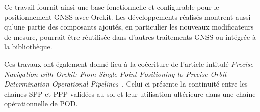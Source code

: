 Ce travail fournit ainsi une base fonctionnelle et configurable pour le
positionnement GNSS avec Orekit. Les développements réalisés montrent aussi
qu'une partie des composants ajoutés, en particulier les nouveaux modificateurs
de mesure, pourrait être réutilisée dans d'autres traitements GNSS ou intégrée à
la bibliothèque.

Ces travaux ont également donné lieu à la coécriture de l'article intitulé \textit{Precise Navigation with Orekit: From
Single Point Positioning to Precise Orbit Determination Operational
Pipelines}~\cite{zemouliScardino2026preciseNavigation}. Celui-ci présente la
continuité entre les chaînes SPP et PPP validées au sol et leur utilisation
ultérieure dans une chaîne opérationnelle de POD.
